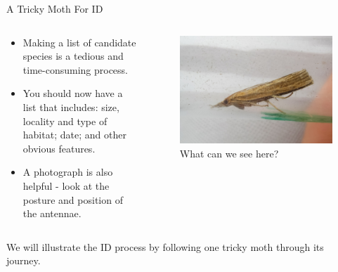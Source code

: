 \documentclass[
  ignorenonframetext,
]{beamer}
\providecommand{\tightlist}{%
  \setlength{\itemsep}{0pt}\setlength{\parskip}{0pt}}
\begin{document}
\begin{frame}{A Tricky Moth For ID}
\protect\hypertarget{a-tricky-moth-for-id}{}
\begin{columns}[T]
\begin{column}{0.5\textwidth}
\begin{itemize}
\tightlist
\item
  Making a list of candidate species is a tedious and time-consuming
  process.
\item
  You should now have a list that includes: size, locality and type of
  habitat; date; and other obvious features.
\item
  A photograph is also helpful - look at the posture and position of the
  antennae.
\end{itemize}
\end{column}

\begin{column}{0.5\textwidth}
\begin{figure}
\centering
\includegraphics{./images/Pcontaminella-PML-2021.jpg}
\caption{What can we see here?}
\end{figure}
\end{column}
\end{columns}

We will illustrate the ID process by following one tricky moth through
its journey.
\end{frame}
\end{document}
